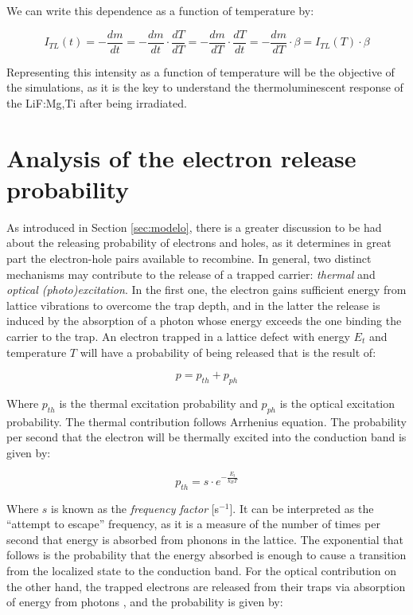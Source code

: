 We can write this dependence as a function of temperature by:

\begin{equation}
  I_{T\!L}(t) = -\frac{dm}{dt} = -\frac{dm}{dt} \cdot \frac{dT}{dT} = -\frac{dm}{dT} \cdot \frac{dT}{dt} = -\frac{dm}{dT} \cdot \beta = I_{T\!L}(T) \cdot \beta
\end{equation}

Representing this intensity as a function of temperature will be the objective of the simulations, as it is the key to understand the thermoluminescent response of the LiF:Mg,Ti after being irradiated.

\section{Analysis of the electron release probability} \label{sec:factorfrecuencia}

As introduced in Section \ref{sec:modelo}, there is a greater discussion to be had about the releasing probability of electrons and holes, as it determines in great part the electron-hole pairs available to recombine. In general, two distinct mechanisms may contribute to the release of a trapped carrier: \textit{thermal} and \textit{optical (photo)excitation}. In the first one, the electron gains sufficient energy from lattice vibrations to overcome the trap depth, and in the latter the release is induced by the absorption of a photon whose energy exceeds the one binding the carrier to the trap. An electron trapped in a lattice defect with energy $E_t$ and temperature $T$ will have a probability of being released that is the result of:

\begin{equation}
  p = p_{th} + p_{ph}
\end{equation}

Where $p_{th}$ is the thermal excitation probability and $p_{ph}$ is the optical excitation probability. The thermal contribution follows Arrhenius equation. The probability per second that the electron will be thermally excited into the conduction band is given by:

\begin{equation} \label{eq:p_th}
  p_{th} = s \cdot e^{-\frac{E_t}{k_B T}}
\end{equation}

\vspace{10pt}
Where $s$ is known as the \textit{frequency factor} [s$^{-1}$]. It can be interpreted as the ``attempt to escape'' frequency, as it is a measure of the number of times per second that energy is absorbed from phonons in the lattice. The exponential that follows is the probability that the energy absorbed is enough to cause a transition from the localized state to the conduction band. For the optical contribution on the other hand, the trapped electrons are released from their traps via absorption of energy from photons \cite{mckeever_course_2022}, and the probability is given by:

